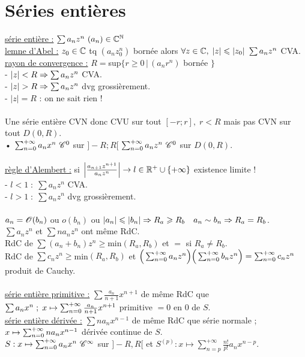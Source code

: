 \documentclass[12 pt]{book}
\begin{document}
\section*{Séries entières}
\underline{série entière :} $\sum a_n z^n \ (a_n)\in\C^\N$\\
\underline{lemne d'Abel :} $z_0\in\mathbb{C}$ tq $(a_n z_0^n)$ bornée alors $\forall z\in\mathbb{C}, \; |z|\leqslant|z_0| \ \sum a_n z^n$ CVA.\\
\underline{rayon de convergence :} $R = $sup$ \{r\geqslant0 \, |\, (a_n r^n)$ bornée $\}$\\
- $|z|<R \Rightarrow \sum a_n z^n$ CVA.\\
- $|z|>R \Ra \sum a_n z^n$ dvg grossièrement.\\
- $|z| = R$ : on ne sait rien !\\
\text{}\\
Une série entière CVN donc CVU sur tout $[-r;r],\; r<R$ mais pas CVN sur tout $D(0,R)$.\\
• $\sum_{n=0}^{+\infty} a_n x^n \ \mathscr{C}^0$ sur $]-R;R[$ \qquad $\sum_{n=0}^{+\infty} a_n z^n \ \mathscr{C}^0$ sur $D(0,R)$.\\
\text{}\\
\underline{règle d'Alembert :} si $\Big|\frac{a_{n+1} z^{n+1}}{a_n z^n} \Big| \to l\in \mathbb{R}^+ \cup \{+\infty\}$ \quad  existence limite !\\
- $l<1 \; : \; \sum a_n z^n$ CVA.\\
- $l>1 \; : \; \sum a_n z^n$ dvg grossièrement.\\
\text{}\\
$a_n = \mathscr{O}(b_n)$ ou $o(b_n)$ ou $|a_n|\leqslant |b_n| \Rightarrow R_a\geqslant R_b \quad a_n\sim b_n \Rightarrow R_a = R_b$.\\
$\sum a_n z^n$ et $\sum n a_n z^n$ ont même RdC.\\
RdC de $\sum (a_n + b_n)z^n \geqslant $min$(R_a,R_b)$ et $=$ si $R_a\neq R_b$.\\
RdC de $\sum c_n z^n \geqslant $min$(R_a,R_b)$ et $\Big(\sum_{n=0}^{+\infty} a_n z^n\Big)\Big(\sum_{n=0}^{+\infty} b_n z^n\Big) = \sum_{n=0}^{+\infty} c_n z^n$ produit de Cauchy.\\
\text{}\\
\underline{série entière primitive :} $\sum \frac{a_n}{n+1} x^{n+1}$ de même RdC que $\sum a_n x^n \; ; \; x\mapsto \sum_{n=0}^{+\infty} \frac{a_n}{n+1} x^{n+1}$ primitive $=0$ en $0$ de $S$.\\
\underline{série entière dérivée :} $\sum n a_n x^{n-1}$ de même RdC que série normale ; $x\mapsto \sum_{n=0}^{+\infty} n a_n x^{n-1}$ dérivée continue de $S$.\\
$S : x\mapsto \sum_{n=0}^{+\infty} a_n x^n \ \mathscr{C}^\infty$ sur $]-R,R[$ et $S^{(p)} : x\mapsto \sum_{n=p}^{+\infty} \frac{n!}{p!} a_n x^{n-p}$.\\
\end{document}
